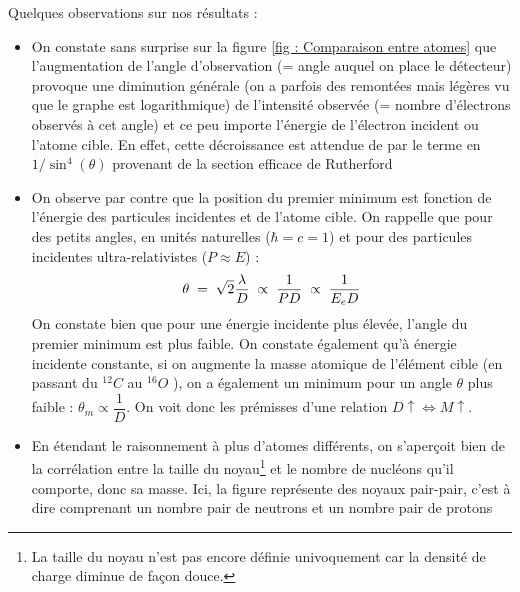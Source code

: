 Quelques observations sur nos résultats :
\begin{itemize}
    \item On constate sans surprise sur la figure \eqref{fig : Comparaison entre atomes} que l'augmentation de l'angle d'observation (= angle auquel on place le détecteur) provoque une diminution générale (on a parfois des remontées mais légères vu que le graphe est logarithmique) de l'intensité observée (= nombre d'électrons observés à cet angle) et ce peu importe l'énergie de l'électron incident ou l'atome cible. En effet, cette décroissance est attendue de par le terme en  $1/\sin^4(\theta)$ provenant de la section efficace de Rutherford

    \item On observe par contre que la position du premier minimum est fonction de l'énergie des particules incidentes et de l'atome cible. On rappelle que pour des petits angles, en unités naturelles ($\hbar = c = 1$) et pour des particules incidentes ultra-relativistes ($P \approx E$) :
    \[
        \theta \; = \; \sqrt{2} \dfrac{\lambda}{D} \; \propto \; \dfrac{1}{P D} \; \propto \; \dfrac{1}{E_e D}
    \]
    On constate bien que pour une énergie incidente plus élevée, l'angle du premier minimum est plus faible. On constate également qu'à énergie incidente constante, si on augmente la masse atomique de l'élément cible (en passant du $^{12}C$ au $^{16}O$ ), on a également un minimum pour un angle $\theta$ plus faible : $\theta_m \propto \dfrac{1}{D}$. On voit donc les prémisses d'une relation $D\uparrow \Leftrightarrow M\uparrow$.\\
    \item En étendant le raisonnement à plus d'atomes différents, on s'aperçoit bien de la corrélation entre la taille du noyau\footnote{La taille du noyau n'est pas encore définie univoquement car la densité de charge diminue de façon douce.} et le nombre de nucléons qu'il comporte, donc sa masse. Ici, la figure représente des noyaux pair-pair, c'est à dire comprenant un nombre pair de neutrons et un nombre pair de protons
     \begin{figure}[H]
        \centering

\end{figure}
\end{itemize}
